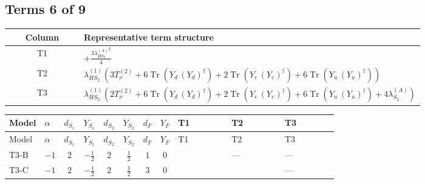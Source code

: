 \documentclass[8pt]{article}
\begin{document}
\begin{landscape}
\subsection*{Terms 6 of 9}
\begin{center}
\begin{tabular}{@{}c >{\raggedright\arraybackslash}p{0.82\linewidth}@{}}
\toprule
Column & Representative term structure \\
\midrule
T1 & \(\displaystyle +\frac{3 {\lambda_{HS_2}^{(A)}}^2}{4}\) \\
\midrule
T2 & \(\displaystyle {\lambda_{HS_2}^{(1)}} (3 T_{\nu}^{(2)}+6 \operatorname{Tr}\!\left({Y_d}\,\left({Y_d}\right)^{\dagger}\right)+2 \operatorname{Tr}\!\left({Y_e}\,\left({Y_e}\right)^{\dagger}\right)+6 \operatorname{Tr}\!\left({Y_u}\,\left({Y_u}\right)^{\dagger}\right))\) \\
\midrule
T3 & \(\displaystyle {\lambda_{HS_2}^{(1)}} (2 T_{\nu}^{(2)}+6 \operatorname{Tr}\!\left({Y_d}\,\left({Y_d}\right)^{\dagger}\right)+2 \operatorname{Tr}\!\left({Y_e}\,\left({Y_e}\right)^{\dagger}\right)+6 \operatorname{Tr}\!\left({Y_u}\,\left({Y_u}\right)^{\dagger}\right)+4 {\lambda_{S_2}^{(A)}})\) \\
\midrule
\bottomrule
\end{tabular}
\end{center}
\smallskip
\tiny
\begin{longtable}{@{}llcccccc >{\raggedright\arraybackslash}p{0.21\linewidth} >{\raggedright\arraybackslash}p{0.21\linewidth} >{\raggedright\arraybackslash}p{0.21\linewidth}@{}}
\toprule
Model & $\alpha$ & $d_{S_1}$ & $Y_{S_1}$ & $d_{S_2}$ & $Y_{S_2}$ & $d_F$ & $Y_F$ & T1 & T2 & T3 \\
\midrule
\endfirsthead
\toprule
Model & $\alpha$ & $d_{S_1}$ & $Y_{S_1}$ & $d_{S_2}$ & $Y_{S_2}$ & $d_F$ & $Y_F$ & T1 & T2 & T3 \\
\midrule
\endhead
T3-B & $-1$ & $2$ & $-\frac{1}{2}$ & $2$ & $\frac{1}{2}$ & $1$ & $0$ & \scriptsize\adjustbox{max width=\linewidth}{$\begin{gathered} +\frac{3 {\lambda_{HS_2}^{(A)}}^2}{4}\end{gathered}$} & --- & --- \\
\midrule
T3-C & $-1$ & $2$ & $-\frac{1}{2}$ & $2$ & $\frac{1}{2}$ & $3$ & $0$ & \scriptsize\adjustbox{max width=\linewidth}{$\begin{gathered} +\frac{3 {\lambda_{HS_2}^{(A)}}^2}{4}\end{gathered}$} & \scriptsize\adjustbox{max width=\linewidth}{$\begin{gathered} {\lambda_{HS_2}^{(1)}} (3 T_{\nu}^{(2)}+6 \operatorname{Tr}\!\left({Y_d}\,\left({Y_d}\right)^{\dagger}\right)+2 \operatorname{Tr}\!\left({Y_e}\,\left({Y_e}\right)^{\dagger}\right)+6 \operatorname{Tr}\!\left({Y_u}\,\left({Y_u}\right)^{\dagger}\right))\end{gathered}$} & --- \\

\end{longtable}
\end{landscape}
\end{document}
